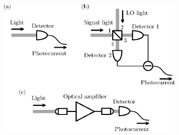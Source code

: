 \begin{figure}
  \centering
  \includegraphics[width=9cm]{fig/1-1_photodetection.eps}
  \label{fig:photodetection}
\end{figure}


